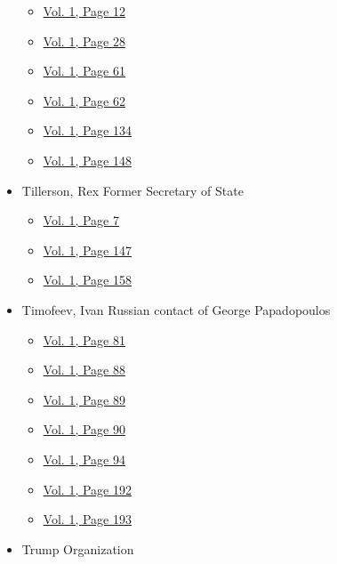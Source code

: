 \begin{itemize}
  \begin{itemize}
  \tightlist
  \item
    \protect\hyperlink{g-page-20}{Vol. 1, Page 12}
  \item
    \protect\hyperlink{g-page-36}{Vol. 1, Page 28}
  \item
    \protect\hyperlink{g-page-69}{Vol. 1, Page 61}
  \item
    \protect\hyperlink{g-page-70}{Vol. 1, Page 62}
  \item
    \protect\hyperlink{g-page-142}{Vol. 1, Page 134}
  \item
    \protect\hyperlink{g-page-156}{Vol. 1, Page 148}
  \end{itemize}
\item
  Tillerson, Rex Former Secretary of State

  \begin{itemize}
  \tightlist
  \item
    \protect\hyperlink{g-page-15}{Vol. 1, Page 7}
  \item
    \protect\hyperlink{g-page-155}{Vol. 1, Page 147}
  \item
    \protect\hyperlink{g-page-166}{Vol. 1, Page 158}
  \end{itemize}
\item
  Timofeev, Ivan Russian contact of George Papadopoulos

  \begin{itemize}
  \tightlist
  \item
    \protect\hyperlink{g-page-89}{Vol. 1, Page 81}
  \item
    \protect\hyperlink{g-page-96}{Vol. 1, Page 88}
  \item
    \protect\hyperlink{g-page-97}{Vol. 1, Page 89}
  \item
    \protect\hyperlink{g-page-98}{Vol. 1, Page 90}
  \item
    \protect\hyperlink{g-page-102}{Vol. 1, Page 94}
  \item
    \protect\hyperlink{g-page-200}{Vol. 1, Page 192}
  \item
    \protect\hyperlink{g-page-201}{Vol. 1, Page 193}
  \end{itemize}
\item
  Trump Organization


\end{itemize}
